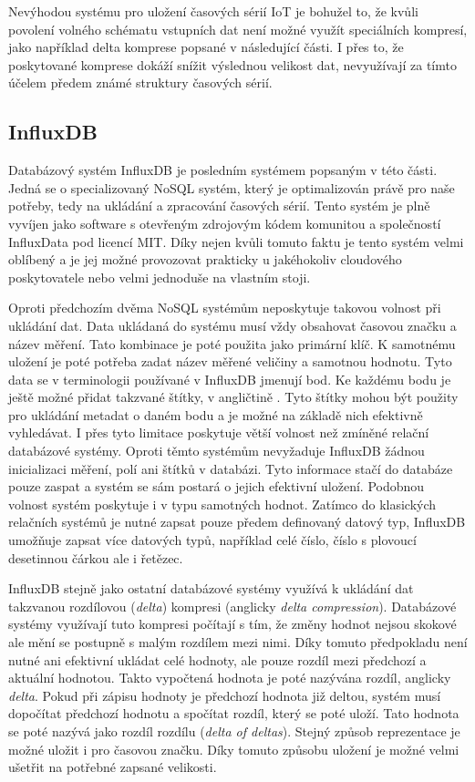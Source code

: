 Nevýhodou systému pro uložení časových sérií IoT je bohužel to, že kvůli povolení volného schématu vstupních dat není možné využít speciálních kompresí, jako například delta komprese popsané v následující části. I přes to, že poskytované komprese dokáží snížit výslednou velikost dat, nevyužívají za tímto účelem předem známé struktury časových sérií.

\subsection{InfluxDB}
Databázový systém InfluxDB je posledním systémem popsaným v této části. Jedná se o specializovaný NoSQL systém, který je optimalizován právě pro naše potřeby, tedy na ukládání a zpracování časových sérií. Tento systém je plně vyvíjen jako software s otevřeným zdrojovým kódem komunitou a společností InfluxData pod licencí MIT. Díky nejen kvůli tomuto faktu je tento systém velmi oblíbený a je jej možné provozovat prakticky u jakéhokoliv cloudového poskytovatele nebo velmi jednoduše na vlastním stoji.

Oproti předchozím dvěma NoSQL systémům neposkytuje takovou volnost při ukládání dat. Data ukládaná do systému musí vždy obsahovat časovou značku a název měření. Tato kombinace je poté použita jako primární klíč. K samotnému uložení je poté potřeba zadat název měřené veličiny a samotnou hodnotu. Tyto data se v terminologii používané v InfluxDB jmenují bod. Ke každému bodu je ještě možné přidat takzvané štítky, v angličtině . Tyto štítky mohou být použity pro ukládání metadat o daném bodu a je možné na základě nich efektivně vyhledávat. I přes tyto limitace poskytuje větší volnost než zmíněné relační databázové systémy. Oproti těmto systémům nevyžaduje InfluxDB žádnou inicializaci měření, polí ani štítků v databázi. Tyto informace stačí do databáze pouze zaspat a systém se sám postará o jejich efektivní uložení. Podobnou volnost systém poskytuje i v typu samotných hodnot. Zatímco do klasických relačních systémů je nutné zapsat pouze předem definovaný datový typ, InfluxDB umožňuje zapsat více datových typů, například celé číslo, číslo s plovoucí desetinnou čárkou ale i řetězec.

InfluxDB stejně jako ostatní databázové systémy využívá k ukládání dat takzvanou rozdílovou (\textit{delta}) kompresi (anglicky \textit{delta compression}). Databázové systémy využívají tuto kompresi počítají s tím, že změny hodnot nejsou skokové ale mění se postupně s malým rozdílem mezi nimi. Díky tomuto předpokladu není nutné ani efektivní ukládat celé hodnoty, ale pouze rozdíl mezi předchozí a aktuální hodnotou. Takto vypočtená hodnota je poté nazývána rozdíl, anglicky \textit{delta}. Pokud při zápisu hodnoty je předchozí hodnota již deltou, systém musí dopočítat předchozí hodnotu a spočítat rozdíl, který se poté uloží. Tato hodnota se poté nazývá jako rozdíl rozdílu (\textit{delta of deltas}). Stejný způsob reprezentace je možné uložit i pro časovou značku. Díky tomuto způsobu uložení je možné velmi ušetřit na potřebné zapsané velikosti.

